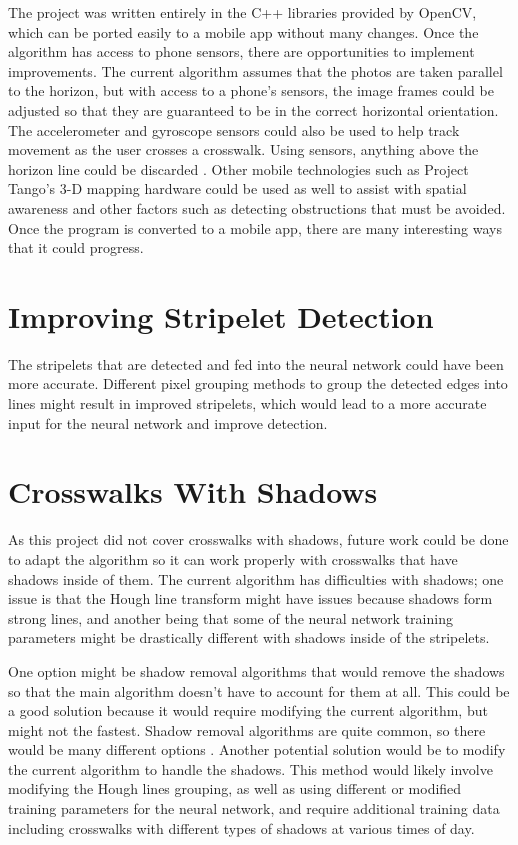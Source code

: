 \documentclass[12pt]{ucthesis}
\begin{document}
The project was written entirely in the C++ libraries provided by OpenCV, which can be ported easily to a mobile app without many changes. Once the algorithm has access to phone sensors, there are opportunities to implement improvements. The current algorithm assumes that the photos are taken parallel to the horizon, but with access to a phone's sensors, the image frames could be adjusted so that they are guaranteed to be in the correct horizontal orientation. The accelerometer and gyroscope sensors could also be used to help track movement as the user crosses a crosswalk. Using sensors, anything above the horizon line could be discarded \cite{Crosswatch2Lane}. Other mobile technologies such as Project Tango's 3-D mapping hardware \cite{projectTango} could be used as well to assist with spatial awareness and other factors such as detecting obstructions that must be avoided. Once the program is converted to a mobile app, there are many interesting ways that it could progress.

\section{Improving Stripelet Detection}

The stripelets that are detected and fed into the neural network could have been more accurate. Different pixel grouping methods to group the detected edges into lines might result in improved stripelets, which would lead to a more accurate input for the neural network and improve detection.

\section{Crosswalks With Shadows}

As this project did not cover crosswalks with shadows, future work could be done to adapt the algorithm so it can work properly with crosswalks that have shadows inside of them. The current algorithm has difficulties with shadows; one issue is that the Hough line transform might have issues because shadows form strong lines, and another being that some of the neural network training parameters might be drastically different with shadows inside of the stripelets. 

One option might be shadow removal algorithms that would remove the shadows so that the main algorithm doesn't have to account for them at all. This could be a good solution because it would require modifying the current algorithm, but might not the fastest. Shadow removal algorithms are quite common, so there would be many different options \cite{shadowRemoval}. Another potential solution would be to modify the current algorithm to handle the shadows. This method would likely involve modifying the Hough lines grouping, as well as using different or modified training parameters for the neural network, and require additional training data including crosswalks with different types of shadows at various times of day. 
\end{document}
